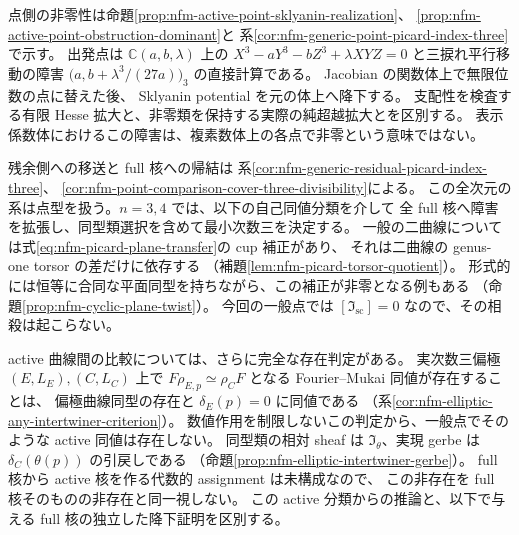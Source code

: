 \documentclass[11pt,a4paper]{ltjsarticle}
\numberwithin{equation}{section}
\newcommand{\C}{\mathbb C}
\begin{document}
点側の非零性は命題\ref{prop:nfm-active-point-sklyanin-realization}、
\ref{prop:nfm-active-point-obstruction-dominant}と
系\ref{cor:nfm-generic-point-picard-index-three}で示す。
出発点は $\C(a,b,\lambda)$ 上の
$X^3-aY^3-bZ^3+\lambda XYZ=0$ と三捩れ平行移動の障害
$\bigl(a,b+\lambda^3/(27a)\bigr)_3$ の直接計算である。
Jacobian の関数体上で無限位数の点に替えた後、
Sklyanin potential を元の体上へ降下する。
支配性を検査する有限 Hesse 拡大と、非零類を保持する実際の純超越拡大とを区別する。
表示係数体におけるこの障害は、複素数体上の各点で非零という意味ではない。

残余側への移送と full 核への帰結は
系\ref{cor:nfm-generic-residual-picard-index-three}、
\ref{cor:nfm-point-comparison-cover-three-divisibility}による。
この全次元の系は点型を扱う。$n=3,4$ では、以下の自己同値分類を介して
全 full 核へ障害を拡張し、同型類選択を含めて最小次数三を決定する。
一般の二曲線については式\eqref{eq:nfm-picard-plane-transfer}の cup 補正があり、
それは二曲線の genus-one torsor の差だけに依存する
（補題\ref{lem:nfm-picard-torsor-quotient}）。
形式的には恒等に合同な平面同型を持ちながら、この補正が非零となる例もある
（命題\ref{prop:nfm-cyclic-plane-twist}）。
今回の一般点では $[\mathfrak I_{\mathrm{sc}}]=0$ なので、その相殺は起こらない。

active 曲線間の比較については、さらに完全な存在判定がある。
実次数三偏極 $(E,L_E),(C,L_C)$ 上で
$F\rho_{E,p}\simeq\rho_CF$ となる Fourier--Mukai 同値が存在することは、
偏極曲線同型の存在と $\delta_E(p)=0$ に同値である
（系\ref{cor:nfm-elliptic-any-intertwiner-criterion}）。
数値作用を制限しないこの判定から、一般点でそのような active 同値は存在しない。
同型類の相対 sheaf は $\mathfrak I_\theta$、実現 gerbe は
$\delta_C(\theta(p))$ の引戻しである
（命題\ref{prop:nfm-elliptic-intertwiner-gerbe}）。
full 核から active 核を作る代数的 assignment は未構成なので、
この非存在を full 核そのものの非存在と同一視しない。
この active 分類からの推論と、以下で与える full 核の独立した降下証明を区別する。
\end{document}
